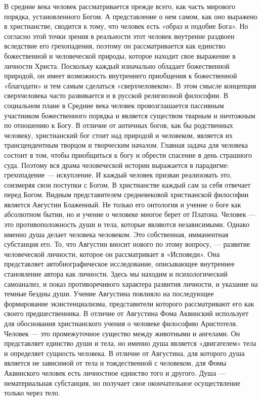 \documentclass[12pt]{article}
\begin{document}
В средние века человек рассматривается прежде всего, как часть мирового порядка, установленного Богом. А
представление о нем самом, как оно выражено в христианстве, сводится к тому, что человек есть «образ и
подобие Бога». Но согласно этой точки зрения в реальности этот человек внутренне раздвоен вследствие его
грехопадения,  поэтому  он  рассматривается  как  единство  божественной  и  человеческой  природы,  которое 
находит свое выражение в личности Христа. Поскольку каждый изначально обладает божественной природой,
он  имеет  возможность  внутреннего  приобщения  к  божественной  «благодати»  и  тем  самым  сделаться
«сверхчеловеком».  В  этом  смысле  концепция  сверхчеловека  часто  развивается  и  в  русской  религиозной
философии.
В социальном плане в Средние века человек провозглашается пассивным участником божественного порядка и
является  существом  тварным  и  ничтожным  по  отношению  к  Богу.  В  отличие  от  античных  богов,  как  бы
родственных  человеку,  христианский  бог  стоит  над  природой  и  человеком,  является  их  трансцендентным
творцом и творческим началом. Главная задача для человека состоит в том, чтобы приобщиться к богу и
обрести спасение в день страшного суда. Поэтому вся драма человеческой истории выражается в парадигме:
грехопадение — искупление. И каждый человек призван реализовать это, соизмеряя свои поступки с Богом. В
христианстве каждый сам за себя отвечает перед Богом.
Видным представителем средневековой христианской философии является Августин Блаженный. Не только его
онтология и учение о боге как абсолютном бытии, но и учение о человеке многое берет от Платона. Человек —
это противоположность души и тела, которые являются независимыми. Однако именно душа делает человека
человеком. Это собственная, имманентная субстанция его. То, что Августин вносит нового по этому вопросу, —
развитие  человеческой  личности,  которое  он  рассматривает  в  «Исповеди».  Она  представляет
автобиографическое  исследование,  описывающее  внутреннее  становление  автора  как  личности.  Здесь  мы
находим и психологический самоанализ, и показ противоречивого характера развития личности, и указание на
темные  бездны  души.  Учение  Августина  повлияло  на  последующее  формирование  экзистенциализма,
представители которого рассматривают его как своего предшественника.
В  отличие  от  Августина  Фома  Аквинский  использует  для  обоснования  христианского  учения  о  человеке
философию  Аристотеля.  Человек  —  это  промежуточное  существо  между  животными  и  ангелами.  Он
представляет  единство  души  и  тела,  но  именно  душа  является  «двигателем»  тела  и  определяет  сущность
человека.  В  отличие  от  Августина,  для  которого  душа  является  не  зависимой  от  тела  и  тождественной  с
человеком, для Фомы Аквинского человек есть личностное единство того и другого. Душа — нематериальная
субстанция, но получает свое окончательное осуществление только через тело.
\end{document}
